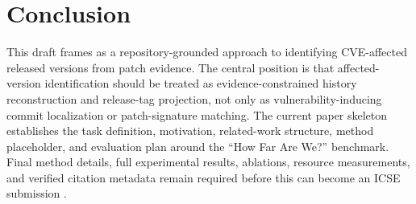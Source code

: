 \section{Conclusion}

This draft frames \toolname as a repository-grounded approach to identifying CVE-affected released versions from patch evidence. The central position is that affected-version identification should be treated as evidence-constrained history reconstruction and release-tag projection, not only as vulnerability-inducing commit localization or patch-signature matching. The current paper skeleton establishes the task definition, motivation, related-work structure, method placeholder, and evaluation plan around the ``How Far Are We?'' benchmark. Final method details, full experimental results, ablations, resource measurements, and verified citation metadata remain required before this can become an ICSE submission .
